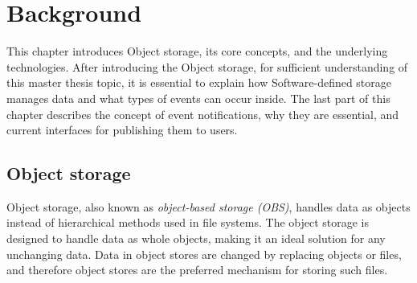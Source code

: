 \chapter{Background}

    This chapter introduces Object storage, its core concepts, and the underlying technologies. After introducing the Object storage, for sufficient understanding of this master thesis topic, it is essential to explain how Software-defined storage manages data and what types of events can occur inside. The last part of this chapter describes the concept of event notifications, why they are essential, and current interfaces for publishing them to users.

\section{Object storage}
    Object storage, also known as \textit{object-based storage (OBS)}, handles data as objects instead of hierarchical methods used in file systems\cite{objectBasedStorage}. The object storage is designed to handle data as whole objects, making it an ideal solution for any unchanging data. Data in object stores are changed by replacing objects or files, and therefore object stores are the preferred mechanism for storing such files\cite{networkStorage}.

